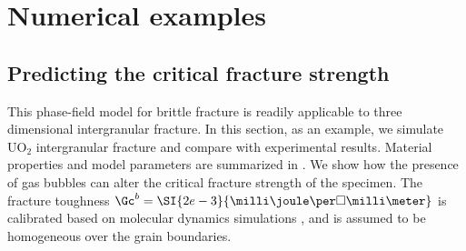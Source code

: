 \section{Numerical examples}
\label{section: Chapter3/examples}

\subsection{Predicting the critical fracture strength}

This phase-field model for brittle fracture is readily applicable to three dimensional intergranular fracture. In this section, as an example, we simulate UO$_2$ intergranular fracture and compare with experimental results. Material properties and model parameters are summarized in . We show how the presence of gas bubbles can alter the critical fracture strength of the specimen. The fracture toughness $\Gc^b = \SI{2e-3}{\milli\joule\per\square\milli\meter}$ is calibrated based on molecular dynamics simulations \cite{pritam_2016}, and is assumed to be homogeneous over the grain boundaries.

